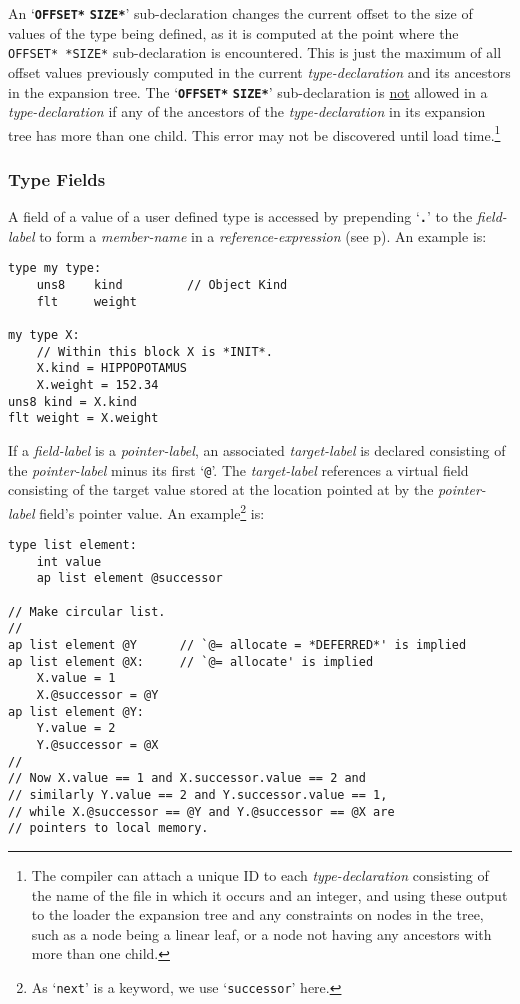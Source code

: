 \documentclass[12pt]{article}
\newcommand{\TT}[1]{{\tt \bfseries #1}}
\newcommand{\ttkey}[1]{{\tt \bfseries #1}}
\newcommand{\pagref}[1]{p\pageref{#1}}
\newenvironment{indpar}[1][0.3in]%
	{\begin{list}{}%
		     {\setlength{\itemsep}{0in}%
		      \setlength{\topsep}{0in}%
		      \setlength{\parsep}{1ex}%
		      \setlength{\labelwidth}{#1}%
		      \setlength{\leftmargin}{#1}%
		      \addtolength{\leftmargin}{\labelsep}}%
	 \item}%
	{\end{list}}
\begin{document}
An `\ttkey{*OFFSET*} \ttkey{*SIZE*}'\label{OFFSET-SIZE} sub-declaration
changes the current offset to the size of values of the type
being defined, as it is computed at the point where the {\tt *OFFSET* *SIZE*}
sub-declaration is encountered.  This is just the maximum of all
offset values previously computed in the current {\em type-declaration}
and its ancestors in the expansion tree.
The `\ttkey{*OFFSET*} \ttkey{*SIZE*}' sub-declaration
is \underline{not} allowed in a {\em type-declaration}
if any of the ancestors of the {\em type-declaration} in its expansion
tree has more than one child.  This error may not be discovered until
load time.\footnote{
The compiler can attach a unique ID to each {\em type-declaration}
consisting of the name of the file in which it occurs and an integer,
and using these output to the loader the expansion tree and any constraints
on nodes in the tree, such as a node being a linear leaf, or a node not
having any ancestors with more than one child.}

\subsubsection{Type Fields}

A field of a value of a user defined type is accessed by prepending
`\TT{.}' to the {\em field-label} to form a {\em member-name} in
a {\em reference-expression} (see \pagref{RUN-TIME-FIELD-SELECTION}).
An example is:

\begin{indpar}\begin{verbatim}
type my type:
    uns8    kind         // Object Kind
    flt     weight

my type X:
    // Within this block X is *INIT*.
    X.kind = HIPPOPOTAMUS
    X.weight = 152.34
uns8 kind = X.kind
flt weight = X.weight
\end{verbatim}\end{indpar}

If a {\em field-label} is a {\em pointer-label}, an
associated {\em target-label} is declared consisting of the
{\em pointer-label} minus its first `{\tt @}'.  The {\em target-label}
references a virtual field consisting of the target value stored
at the location pointed at by the {\em pointer-label} field's pointer value.
An example\footnote{As `{\tt next}' is a keyword, we use `{\tt successor}'
here.} is:

\begin{indpar}\begin{verbatim}
type list element:
    int value
    ap list element @successor

// Make circular list.
//
ap list element @Y      // `@= allocate = *DEFERRED*' is implied
ap list element @X:     // `@= allocate' is implied
    X.value = 1
    X.@successor = @Y
ap list element @Y:
    Y.value = 2
    Y.@successor = @X
//
// Now X.value == 1 and X.successor.value == 2 and
// similarly Y.value == 2 and Y.successor.value == 1,
// while X.@successor == @Y and Y.@successor == @X are
// pointers to local memory.
\end{verbatim}\end{indpar}
\end{document}
